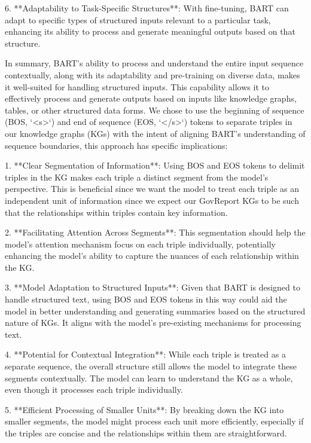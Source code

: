 \documentclass[12pt]{article}
\begin{document}
6. **Adaptability to Task-Specific Structures**: With fine-tuning, BART can adapt to specific types of structured inputs relevant to a particular task, enhancing its ability to process and generate meaningful outputs based on that structure.

In summary, BART's ability to process and understand the entire input sequence contextually, along with its adaptability and pre-training on diverse data, makes it well-suited for handling structured inputs. This capability allows it to effectively process and generate outputs based on inputs like knowledge graphs, tables, or other structured data forms.
We chose to use the beginning of sequence (BOS, `<s>`) and end of sequence (EOS, `</s>`) tokens to separate triples in our knowledge graphs (KGs) with the intent of aligning BART's understanding of sequence boundaries, this approach has specific implications:

1. **Clear Segmentation of Information**: Using BOS and EOS tokens to delimit triples in the KG makes each triple a distinct segment from the model's perspective. This is beneficial since we want the model to treat each triple as an independent unit of information since we expect our GovReport KGs to be such that the relationships within triples contain key information.

2. **Facilitating Attention Across Segments**: This segmentation should help the model's attention mechanism focus on each triple individually, potentially enhancing the model's ability to capture the nuances of each relationship within the KG.

3. **Model Adaptation to Structured Inputs**: Given that BART is designed to handle structured text, using BOS and EOS tokens in this way could aid the model in better understanding and generating summaries based on the structured nature of KGs. It aligns with the model's pre-existing mechanisms for processing text.

4. **Potential for Contextual Integration**: While each triple is treated as a separate sequence, the overall structure still allows the model to integrate these segments contextually. The model can learn to understand the KG as a whole, even though it processes each triple individually.

5. **Efficient Processing of Smaller Units**: By breaking down the KG into smaller segments, the model might process each unit more efficiently, especially if the triples are concise and the relationships within them are straightforward.
\end{document}
